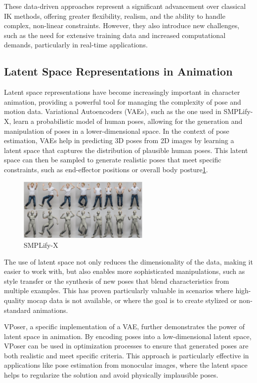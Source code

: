 \documentclass[../../main.tex]{subfiles}
\begin{document}
These data-driven approaches represent a significant advancement over classical IK methods, offering greater flexibility, realism, and the ability to handle complex, non-linear constraints. However, they also introduce new challenges, such as the need for extensive training data and increased computational demands, particularly in real-time applications.

\subsection{Latent Space Representations in Animation}
\label{ch:motion_matching:related_work:latent_space}

Latent space representations have become increasingly important in character animation, providing a powerful tool for managing the complexity of pose and motion data. Variational Autoencoders (VAEs)\cite{kingma2013auto}, such as the one used in SMPLify-X\cite{pavlakos2019expressive}, learn a probabilistic model of human poses, allowing for the generation and manipulation of poses in a lower-dimensional space. In the context of pose estimation, VAEs help in predicting 3D poses from 2D images by learning a latent space that captures the distribution of plausible human poses. This latent space can then be sampled to generate realistic poses that meet specific constraints, such as end-effector positions or overall body posture\ref{fig:simplifyx}.

\begin{figure}
  \centering \includegraphics[width = 2.5in]{chapters/motion_matching/images/simplifyx.png}
  \caption{SMPLify-X}
  \label{fig:simplifyx}
\end{figure}

The use of latent space not only reduces the dimensionality of the data, making it easier to work with, but also enables more sophisticated manipulations, such as style transfer or the synthesis of new poses that blend characteristics from multiple examples. This has proven particularly valuable in scenarios where high-quality mocap data is not available, or where the goal is to create stylized or non-standard animations.

VPoser\cite{pavlakos2019expressive}, a specific implementation of a VAE, further demonstrates the power of latent space in animation. By encoding poses into a low-dimensional latent space, VPoser can be used in optimization processes to ensure that generated poses are both realistic and meet specific criteria. This approach is particularly effective in applications like pose estimation from monocular images, where the latent space helps to regularize the solution and avoid physically implausible poses.
\end{document}
